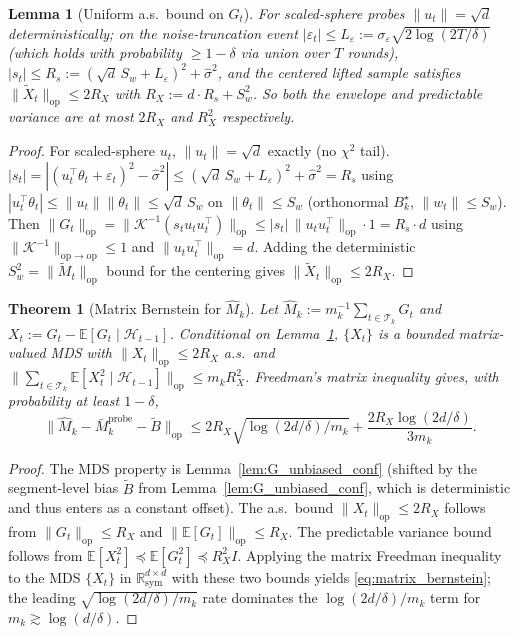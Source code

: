 \documentclass{article}
\newcommand{\R}{\mathbb{R}}
\newcommand{\E}{\mathbb{E}}
\newcommand{\op}{\mathrm{op}}
\newcommand{\cH}{\mathcal{H}}
\newcommand{\cT}{\mathcal{T}}
\newtheorem{theorem}{Theorem}
\newtheorem{lemma}{Lemma}
\begin{document}
\begin{lemma}[Uniform a.s.\ bound on $G_t$]
\label{lem:G_bound_conf}
For scaled-sphere probes $\|u_t\| = \sqrt d$ deterministically; on
the noise-truncation event $|\varepsilon_t|\le L_\varepsilon :=
\sigma_\varepsilon\sqrt{2\log(2T/\delta)}$ (which holds with
probability $\ge 1-\delta$ via union over $T$ rounds), $|s_t|\le R_s
:= (\sqrt d\,S_w + L_\varepsilon)^2 + \hat\sigma^2$, and the centered
lifted sample satisfies $\|\tilde X_t\|_\op \le 2R_X$ with
$R_X := d\cdot R_s + S_w^2$. So both the envelope and predictable
variance are at most $2R_X$ and $R_X^2$ respectively.
\end{lemma}
\begin{proof}
For scaled-sphere $u_t$, $\|u_t\| = \sqrt d$ exactly (no $\chi^2$
tail). $|s_t| = |(u_t^\top\theta_t + \varepsilon_t)^2 - \hat\sigma^2|
\le (\sqrt d\,S_w + L_\varepsilon)^2 + \hat\sigma^2 = R_s$ using
$|u_t^\top\theta_t|\le \|u_t\|\|\theta_t\|\le \sqrt d\,S_w$ on
$\|\theta_t\|\le S_w$ (orthonormal $B_k^\star$, $\|w_t\|\le S_w$).
Then $\|G_t\|_\op = \|\mathcal K^{-1}(s_t u_tu_t^\top)\|_\op
\le |s_t|\,\|u_tu_t^\top\|_\op \cdot 1 = R_s\cdot d$ using
$\|\mathcal K^{-1}\|_{\op\to\op}\le 1$ and $\|u_tu_t^\top\|_\op = d$.
Adding the deterministic $S_w^2 = \|\widetilde M_t\|_\op$ bound for
the centering gives $\|\tilde X_t\|_\op \le 2R_X$.
\end{proof}

\begin{theorem}[Matrix Bernstein for $\widehat M_k$]
\label{thm:matrix_bernstein_conf}
Let $\widehat M_k := m_k^{-1}\sum_{t\in\cT_k} G_t$ and
$X_t := G_t - \E[G_t\mid\cH_{t-1}]$. Conditional on
Lemma~\ref{lem:G_bound_conf}, $\{X_t\}$ is a bounded matrix-valued
MDS with $\|X_t\|_\op\le 2R_X$ a.s.\ and
$\|\sum_{t\in\cT_k}\E[X_t^2\mid\cH_{t-1}]\|_\op\le m_k R_X^2$.
Freedman's matrix inequality \citep{tropp2011freedman} gives, with
probability at least $1-\delta$,
\begin{equation}
\|\widehat M_k - \bar M_k^{\mathrm{probe}} - \widetilde B\|_\op
\le 2R_X\sqrt{\log(2d/\delta)/m_k} + \frac{2R_X\log(2d/\delta)}{3m_k}.
\label{eq:matrix_bernstein}
\end{equation}
\end{theorem}
\begin{proof}
The MDS property is Lemma~\ref{lem:G_unbiased_conf} (shifted by the
segment-level bias $\widetilde B$ from
Lemma~\ref{lem:G_unbiased_conf}, which is deterministic and thus enters
as a constant offset). The a.s.\ bound $\|X_t\|_\op\le 2R_X$ follows
from $\|G_t\|_\op\le R_X$ and $\|\E[G_t]\|_\op\le R_X$. The predictable
variance bound follows from $\E[X_t^2]\preceq \E[G_t^2]\preceq R_X^2 I$.
Applying the matrix Freedman inequality to the MDS $\{X_t\}$ in
$\R^{d\times d}_{\mathrm{sym}}$ with these two bounds yields
\eqref{eq:matrix_bernstein}; the leading $\sqrt{\log(2d/\delta)/m_k}$
rate dominates the $\log(2d/\delta)/m_k$ term for $m_k\gtrsim\log(d/\delta)$.
\end{proof}
\end{document}
